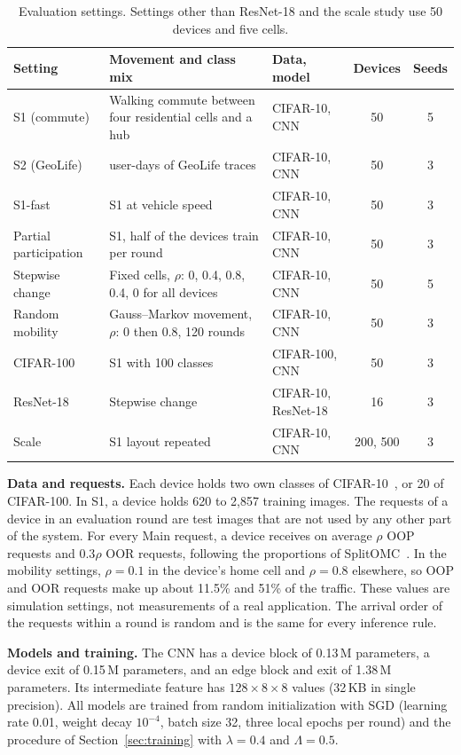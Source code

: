 \begin{table}[t]
\centering
\caption{Evaluation settings. Settings other than ResNet-18 and the scale study use 50 devices and five cells.}
\label{tab:settings}
\footnotesize
\begin{tabular}{l>{\raggedright\arraybackslash}p{7.0cm}lcc}
\toprule
Setting & Movement and class mix & Data, model & Devices & Seeds \\
\midrule
S1 (commute) & Walking commute between four residential cells and a hub & CIFAR-10, CNN & 50 & 5 \\
S2 (GeoLife) & 50 user-days of GeoLife traces & CIFAR-10, CNN & 50 & 3 \\
S1-fast & S1 at vehicle speed & CIFAR-10, CNN & 50 & 3 \\
Partial participation & S1, half of the devices train per round & CIFAR-10, CNN & 50 & 3 \\
Stepwise change & Fixed cells, $\rho$: 0, 0.4, 0.8, 0.4, 0 for all devices & CIFAR-10, CNN & 50 & 5 \\
Random mobility & Gauss--Markov movement, $\rho$: 0 then 0.8, 120 rounds & CIFAR-10, CNN & 50 & 3 \\
CIFAR-100 & S1 with 100 classes & CIFAR-100, CNN & 50 & 3 \\
ResNet-18 & Stepwise change & CIFAR-10, ResNet-18 & 16 & 3 \\
Scale & S1 layout repeated & CIFAR-10, CNN & 200, 500 & 3 \\
\bottomrule
\end{tabular}
\end{table}

\textbf{Data and requests.} Each device holds two own classes of CIFAR-10~\cite{krizhevsky2009cifar}, or 20 of CIFAR-100. In S1, a device holds 620 to 2,857 training images. The requests of a device in an evaluation round are test images that are not used by any other part of the system. For every Main request, a device receives on average $\rho$ OOP requests and $0.3\rho$ OOR requests, following the proportions of SplitOMC~\cite{rizwan2026splitomc}. In the mobility settings, $\rho=0.1$ in the device's home cell and $\rho=0.8$ elsewhere, so OOP and OOR requests make up about 11.5\% and 51\% of the traffic. These values are simulation settings, not measurements of a real application. The arrival order of the requests within a round is random and is the same for every inference rule.

\textbf{Models and training.} The CNN has a device block of 0.13\,M parameters, a device exit of 0.15\,M parameters, and an edge block and exit of 1.38\,M parameters. Its intermediate feature has $128\times8\times8$ values (32\,KB in single precision). All models are trained from random initialization with SGD (learning rate 0.01, weight decay $10^{-4}$, batch size 32, three local epochs per round) and the procedure of Section~\ref{sec:training} with $\lambda=0.4$ and $\Lambda=0.5$.

